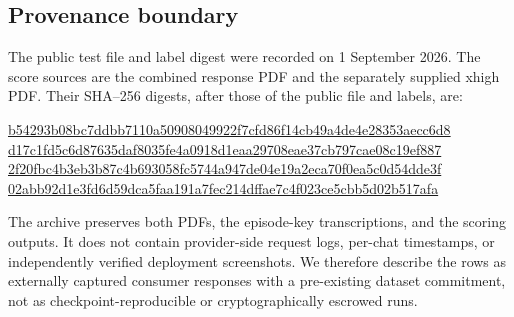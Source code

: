 \subsection{Provenance boundary}

The public test file and label digest were recorded on 1 September 2026.  The
score sources are the combined response PDF and the separately supplied xhigh
PDF.  Their SHA--256 digests, after those of the public file and labels, are:
\begin{center}
\footnotesize
\url{b54293b08bc7ddbb7110a50908049922f7cfd86f14cb49a4de4e28353aecc6d8}\\[-2pt]
\url{d17c1fd5c6d87635daf8035fe4a0918d1eaa29708eae37cb797cae08c19ef887}\\[-2pt]
\url{2f20fbc4b3eb3b87c4b693058fc5744a947de04e19a2eca70f0ea5c0d54dde3f}\\[-2pt]
\url{02abb92d1e3fd6d59dca5faa191a7fec214dffae7c4f023ce5cbb5d02b517afa}
\end{center}
The archive preserves both PDFs, the episode-key transcriptions, and the scoring
outputs.  It does not contain provider-side request logs, per-chat timestamps,
or independently verified deployment screenshots.  We therefore describe the
rows as externally captured consumer responses with a pre-existing dataset
commitment, not as checkpoint-reproducible or cryptographically escrowed runs.
